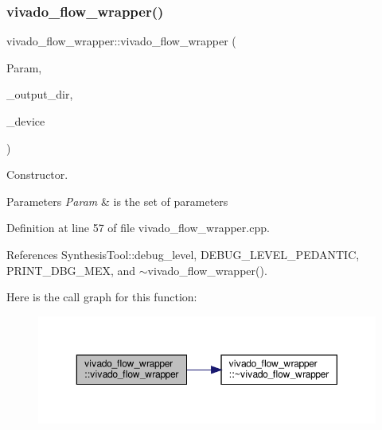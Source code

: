 \subsubsection{\texorpdfstring{vivado\+\_\+flow\+\_\+wrapper()}{vivado\_flow\_wrapper()}}
{\footnotesize\ttfamily vivado\+\_\+flow\+\_\+wrapper\+::vivado\+\_\+flow\+\_\+wrapper (\begin{DoxyParamCaption}\item[{const \hyperlink{Parameter_8hpp_a37841774a6fcb479b597fdf8955eb4ea}{Parameter\+Const\+Ref} \&}]{Param,  }\item[{const std\+::string \&}]{\+\_\+output\+\_\+dir,  }\item[{const \hyperlink{target__device_8hpp_acedb2b7a617e27e6354a8049fee44eda}{target\+\_\+device\+Ref} \&}]{\+\_\+device }\end{DoxyParamCaption})}



Constructor. 


\begin{DoxyParams}{Parameters}
{\em Param} & is the set of parameters \\
\hline
\end{DoxyParams}


Definition at line 57 of file vivado\+\_\+flow\+\_\+wrapper.\+cpp.



References Synthesis\+Tool\+::debug\+\_\+level, D\+E\+B\+U\+G\+\_\+\+L\+E\+V\+E\+L\+\_\+\+P\+E\+D\+A\+N\+T\+IC, P\+R\+I\+N\+T\+\_\+\+D\+B\+G\+\_\+\+M\+EX, and $\sim$vivado\+\_\+flow\+\_\+wrapper().

Here is the call graph for this function\+:
\nopagebreak
\begin{figure}[H]
\begin{center}
\leavevmode
\includegraphics[width=350pt]{d0/da9/classvivado__flow__wrapper_a8d308491e66f2a4106dd0105acee3804_cgraph}
\end{center}
\end{figure}
\mbox{\label{classvivado__flow__wrapper_ace094834eb7a691e72b05f93acd2ea8e}} 
